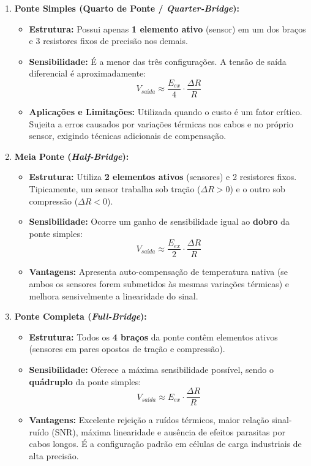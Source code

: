 \begin{enumerate}
    \item \textbf{Ponte Simples (Quarto de Ponte / \textit{Quarter-Bridge}):}
    \begin{itemize}
        \item \textbf{Estrutura:} Possui apenas \textbf{1 elemento ativo} (sensor) em um dos braços e 3 resistores fixos de precisão nos demais.
        \item \textbf{Sensibilidade:} É a menor das três configurações. A tensão de saída diferencial é aproximadamente:
        \begin{equation*}
            V_{sa\text{í}da} \approx \frac{E_{ex}}{4} \cdot \frac{\Delta R}{R}
        \end{equation*}
        \item \textbf{Aplicações e Limitações:} Utilizada quando o custo é um fator crítico. Sujeita a erros causados por variações térmicas nos cabos e no próprio sensor, exigindo técnicas adicionais de compensação.
    \end{itemize}

    \item \textbf{Meia Ponte (\textit{Half-Bridge}):}
    \begin{itemize}
        \item \textbf{Estrutura:} Utiliza \textbf{2 elementos ativos} (sensores) e 2 resistores fixos. Tipicamente, um sensor trabalha sob tração ($\Delta R > 0$) e o outro sob compressão ($\Delta R < 0$).
        \item \textbf{Sensibilidade:} Ocorre um ganho de sensibilidade igual ao \textbf{dobro} da ponte simples:
        \begin{equation*}
            V_{sa\text{í}da} \approx \frac{E_{ex}}{2} \cdot \frac{\Delta R}{R}
        \end{equation*}
        \item \textbf{Vantagens:} Apresenta auto-compensação de temperatura nativa (se ambos os sensores forem submetidos às mesmas variações térmicas) e melhora sensivelmente a linearidade do sinal.
    \end{itemize}

    \item \textbf{Ponte Completa (\textit{Full-Bridge}):}
    \begin{itemize}
        \item \textbf{Estrutura:} Todos os \textbf{4 braços} da ponte contêm elementos ativos (sensores em pares opostos de tração e compressão).
        \item \textbf{Sensibilidade:} Oferece a máxima sensibilidade possível, sendo o \textbf{quádruplo} da ponte simples:
        \begin{equation*}
            V_{sa\text{í}da} \approx E_{ex} \cdot \frac{\Delta R}{R}
        \end{equation*}
        \item \textbf{Vantagens:} Excelente rejeição a ruídos térmicos, maior relação sinal-ruído (SNR), máxima linearidade e ausência de efeitos parasitas por cabos longos. É a configuração padrão em células de carga industriais de alta precisão.
    \end{itemize}
\end{enumerate}
